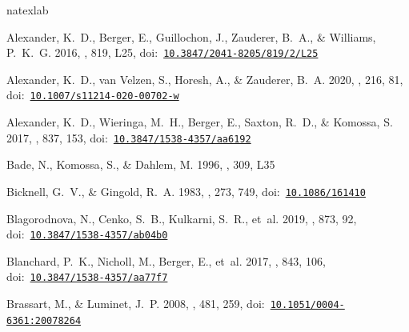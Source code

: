 \documentclass[twocolumn]{aastex62}
\begin{document}
\begin{thebibliography}{}
\expandafter\ifx\csname natexlab\endcsname\relax\def\natexlab#1{#1}\fi
\providecommand{\url}[1]{\href{#1}{#1}}
\providecommand{\dodoi}[1]{doi:~\href{http://doi.org/#1}{\nolinkurl{#1}}}
\providecommand{\doeprint}[1]{\href{http://ascl.net/#1}{\nolinkurl{http://ascl.net/#1}}}
\providecommand{\doarXiv}[1]{\href{https://arxiv.org/abs/#1}{\nolinkurl{https://arxiv.org/abs/#1}}}

{Alexander}, K.~D., {Berger}, E., {Guillochon}, J., {Zauderer}, B.~A., \&
  {Williams}, P.~K.~G. 2016, \apjl, 819, L25,
  \dodoi{10.3847/2041-8205/819/2/L25}

{Alexander}, K.~D., {van Velzen}, S., {Horesh}, A., \& {Zauderer}, B.~A. 2020,
  \ssr, 216, 81, \dodoi{10.1007/s11214-020-00702-w}

{Alexander}, K.~D., {Wieringa}, M.~H., {Berger}, E., {Saxton}, R.~D., \&
  {Komossa}, S. 2017, \apj, 837, 153, \dodoi{10.3847/1538-4357/aa6192}

{Bade}, N., {Komossa}, S., \& {Dahlem}, M. 1996, \aap, 309, L35

{Bicknell}, G.~V., \& {Gingold}, R.~A. 1983, \apj, 273, 749,
  \dodoi{10.1086/161410}

{Blagorodnova}, N., {Cenko}, S.~B., {Kulkarni}, S.~R., {et~al.} 2019, \apj,
  873, 92, \dodoi{10.3847/1538-4357/ab04b0}

{Blanchard}, P.~K., {Nicholl}, M., {Berger}, E., {et~al.} 2017, \apj, 843, 106,
  \dodoi{10.3847/1538-4357/aa77f7}

{Brassart}, M., \& {Luminet}, J.~P. 2008, \aap, 481, 259,
  \dodoi{10.1051/0004-6361:20078264}


\end{thebibliography}
\end{document}
